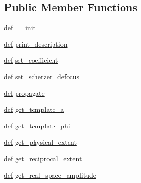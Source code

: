 \subsection*{Public Member Functions}
\begin{DoxyCompactItemize}
\item 
\hyperlink{sim_image_from_wave_8m_a72b6b8e83430abf007f20aeae4dc2f74}{def} \hyperlink{classpython_1_1models_1_1raw__models_1_1probe_1_1probe_a9dac2cd1f7940e173fec76ad1846d235}{\-\_\-\-\_\-init\-\_\-\-\_\-}
\item 
\hyperlink{sim_image_from_wave_8m_a72b6b8e83430abf007f20aeae4dc2f74}{def} \hyperlink{classpython_1_1models_1_1raw__models_1_1probe_1_1probe_aa6ae1a52b0100030d7c57d787c1fafab}{print\-\_\-description}
\item 
\hyperlink{sim_image_from_wave_8m_a72b6b8e83430abf007f20aeae4dc2f74}{def} \hyperlink{classpython_1_1models_1_1raw__models_1_1probe_1_1probe_abd2e506a3106153e626fd6664655ba06}{set\-\_\-coefficient}
\item 
\hyperlink{sim_image_from_wave_8m_a72b6b8e83430abf007f20aeae4dc2f74}{def} \hyperlink{classpython_1_1models_1_1raw__models_1_1probe_1_1probe_af7144a8d7dd5f32cf300c2814d1c0507}{set\-\_\-scherzer\-\_\-defocus}
\item 
\hyperlink{sim_image_from_wave_8m_a72b6b8e83430abf007f20aeae4dc2f74}{def} \hyperlink{classpython_1_1models_1_1raw__models_1_1probe_1_1probe_a5033225e0ad68224ca5bd313a09a72ce}{propagate}
\item 
\hyperlink{sim_image_from_wave_8m_a72b6b8e83430abf007f20aeae4dc2f74}{def} \hyperlink{classpython_1_1models_1_1raw__models_1_1probe_1_1probe_a0cc4aa786dd07b9b8d05cc41b133c8fb}{get\-\_\-template\-\_\-a}
\item 
\hyperlink{sim_image_from_wave_8m_a72b6b8e83430abf007f20aeae4dc2f74}{def} \hyperlink{classpython_1_1models_1_1raw__models_1_1probe_1_1probe_a75e02bbab33f1025f25909386f8ef9cc}{get\-\_\-template\-\_\-phi}
\item 
\hyperlink{sim_image_from_wave_8m_a72b6b8e83430abf007f20aeae4dc2f74}{def} \hyperlink{classpython_1_1models_1_1raw__models_1_1probe_1_1probe_af039e524cc47eec875af9d0d52364b73}{get\-\_\-physical\-\_\-extent}
\item 
\hyperlink{sim_image_from_wave_8m_a72b6b8e83430abf007f20aeae4dc2f74}{def} \hyperlink{classpython_1_1models_1_1raw__models_1_1probe_1_1probe_afa81a2c99628b3390e079b7dcf7c11c4}{get\-\_\-reciprocal\-\_\-extent}
\item 
\hyperlink{sim_image_from_wave_8m_a72b6b8e83430abf007f20aeae4dc2f74}{def} \hyperlink{classpython_1_1models_1_1raw__models_1_1probe_1_1probe_a41daea34cb152cd63885ce5c97908438}{get\-\_\-real\-\_\-space\-\_\-amplitude}

\end{DoxyCompactItemize}
